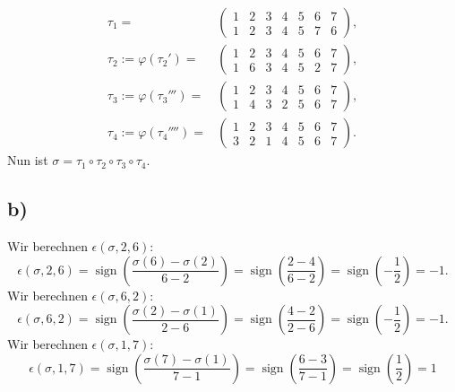 \documentclass{article}
\DeclareMathOperator{\sign}{sign}
\begin{document}
\begin{align*}
  \tau_1 =                        & \begin{pmatrix}
                                      1 & 2 & 3 & 4 & 5 & 6 & 7 \\
                                      1 & 2 & 3 & 4 & 5 & 7 & 6
                                    \end{pmatrix}, \\
  \tau_2 := \varphi(\tau_2') =    & \begin{pmatrix}
                                      1 & 2 & 3 & 4 & 5 & 6 & 7 \\
                                      1 & 6 & 3 & 4 & 5 & 2 & 7
                                    \end{pmatrix}, \\
  \tau_3 := \varphi(\tau_3''') =  & \begin{pmatrix}
                                      1 & 2 & 3 & 4 & 5 & 6 & 7 \\
                                      1 & 4 & 3 & 2 & 5 & 6 & 7
                                    \end{pmatrix}, \\
  \tau_4 := \varphi(\tau_4'''') = & \begin{pmatrix}
                                      1 & 2 & 3 & 4 & 5 & 6 & 7 \\
                                      3 & 2 & 1 & 4 & 5 & 6 & 7
                                    \end{pmatrix}.
\end{align*}
Nun ist $\sigma = \tau_1 \circ \tau_2 \circ \tau_3 \circ \tau_4$.


\subsection*{b)}
Wir berechnen
$\epsilon(\sigma, 2, 6)$:
\[
  \epsilon(\sigma, 2, 6)
  =
  \sign\left(\frac{\sigma(6) - \sigma(2)}{6 - 2}\right)
  =
  \sign\left(\frac{2 - 4}{6 - 2}\right)
  =
  \sign\left(-\frac{1}{2}\right)
  = -1.
\]
Wir berechnen
$\epsilon(\sigma, 6, 2)$:
\[
  \epsilon(\sigma, 6, 2)
  =
  \sign\left(\frac{\sigma(2) - \sigma(1)}{2 - 6}\right)
  =
  \sign\left(\frac{4 - 2}{2 - 6}\right)
  =
  \sign\left(-\frac{1}{2}\right)
  = -1.
\]
Wir berechnen
$\epsilon(\sigma, 1, 7)$:
\[
  \epsilon(\sigma, 1, 7)
  =
  \sign\left(\frac{\sigma(7) - \sigma(1)}{7 - 1}\right)
  =
  \sign\left(\frac{6 - 3}{7 - 1}\right)
  =
  \sign\left(\frac{1}{2}\right)
  = 1
\]
\end{document}
